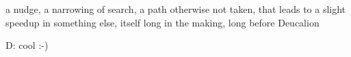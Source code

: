 a nudge, a narrowing of search, a path otherwise not taken, that leads to a slight speedup in something else, itself long in the making, long before Deucalion

D: cool :-)


